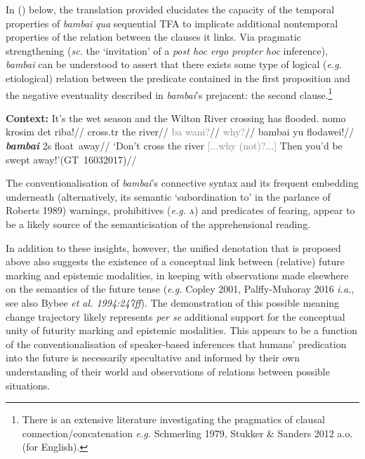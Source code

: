 \documentclass[12pt]{article}
\begin{document}
In (\nextx) below, the translation provided elucidates the capacity of the temporal properties of \textit{bambai} \textit{qua} sequential TFA to implicate additional nontemporal properties of the relation between the clauses it links. Via pragmatic strengthening (\textit{sc.} the `invitation' of a {\em post hoc ergo propter hoc} inference), \textit{bambai} can be understood to assert that there exists some type of logical (\textit{e.g.} etiological) relation between the predicate contained in the first proposition and the negative eventuality described in \textit{bambai}'s prejacent: the second clause.\footnote{There is an extensive literature investigating the pragmatics of clausal connection/concatenation \textit{e.g.} Schmerling 1979, Stukker \& Sanders 2012 a.o. (for English).}

\pex[everylabel=\sc]\label{flodawei} \textbf{Context:} It's the wet season and the Wilton River crossing has flooded.
\a\begingl
\gla nomo krosim det riba!//
 cross.{\sc tr} the river//
\endgl
\a 	\begingl\gla \textcolor{gray}{ba wani?}//
\glb \textcolor{gray}{why?}//
\endgl
\a[label=A]\begingl\gla bambai yu flodawei!//
\glb \textbf{\textit{bambai}} 2s float~away//
\glft`Don't cross the river \textcolor{gray}{[...why (not)?...]} Then you'd be swept away!'\hspace*{\fill}(GT~16032017)//\endgl\xe

The conventionalisation of \textit{bambai}'s connective syntax and its frequent embedding underneath (alternatively, its semantic `subordination to' in the parlance of Roberts 1989) warnings, prohibitives (\textit{e.g. }\lastx\textsc{a}) and predicates of fearing, appear to be a likely source of the semanticisation of the apprehensional reading.

In addition to these insights, however, the unified denotation that is proposed above also suggests the existence of a conceptual link between (relative) future marking and epistemic modalities, in keeping with observations made elsewhere on the semantics of the future tense (\textit{e.g.} Copley 2001, Palffy-Muhoray 2016 \textit{i.a.}, see also Bybee \textit{et al. 1994:247\textit{ff}}). The demonstration of this possible meaning change trajectory likely represents \textit{per se} additional support for the conceptual unity of futurity marking and epistemic modalities. This appears to be a function of the conventionalisation of speaker-based inferences that humans' predication into the future is necessarily specultative and informed by their own understanding of their world and observations of relations between possible situations.
\end{document}
